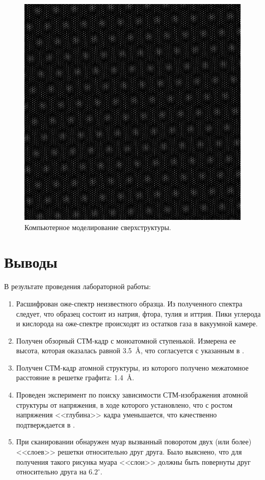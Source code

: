 \documentclass[a4paper, 12pt]{article}
\begin{document}
	\begin{figure}[H]
		\centering
		\includegraphics[width=0.9\linewidth]{../STM_data/Muar/Muar_model}
		\caption{Компьютерное моделирование сверхструктуры.}
		\label{fig:2_muar_model}
	\end{figure}
	
	\section{Выводы}
	
	В результате проведения лабораторной работы:
	
	\begin{enumerate}
		\item Расшифрован оже-спектр неизвестного образца. Из полученного спектра следует, что образец состоит из натрия, фтора, тулия и иттрия. Пики углерода и кислорода на оже-спектре происходят из остатков газа в вакуумной камере.
		
		\item Получен обзорный СТМ-кадр с моноатомной ступенькой. Измерена ее высота, которая оказалась равной 3.5~\AA, что согласуется с указанным в \cite{Article}.
		
		\item Получен СТМ-кадр атомной структуры, из которого получено межатомное расстояние в решетке графита: 1.4~\AA.
		
		\item Проведен эксперимент по поиску зависимости СТМ-изображения атомной структуры от напряжения, в ходе которого установлено, что с ростом напряжения <<глубина>> кадра уменьшается, что качественно подтверждается в \cite{STM_Binnig}.
		
		\item При сканировании обнаружен муар вызванный поворотом двух (или более) <<слоев>> решетки относительно друг друга. Было выяснено, что для получения такого рисунка муара <<слои>> должны быть повернуты друг относительно друга на $6.2^\circ$.
	\end{enumerate}
	
\end{document}
